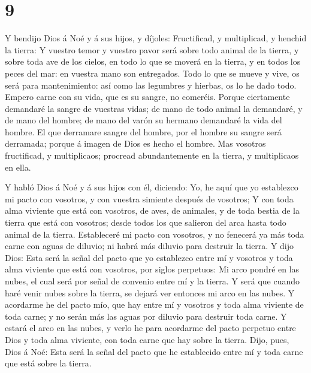 \hypertarget{section-8}{%
\section{9}\label{section-8}}

 Y bendijo Dios á Noé y á sus hijos, y díjoles: Fructificad,
y multiplicad, y henchid la tierra:  Y vuestro temor y
vuestro pavor será sobre todo animal de la tierra, y sobre toda ave de
los cielos, en todo lo que se moverá en la tierra, y en todos los peces
del mar: en vuestra mano son entregados.  Todo lo que se
mueve y vive, os será para mantenimiento: así como las legumbres y
hierbas, os lo he dado todo.  Empero carne con su vida, que
es su sangre, no comeréis.  Porque ciertamente demandaré la
sangre de vuestras vidas; de mano de todo animal la demandaré, y de mano
del hombre; de mano del varón su hermano demandaré la vida del hombre.
 El que derramare sangre del hombre, por el hombre su sangre
será derramada; porque á imagen de Dios es hecho el hombre. 
Mas vosotros fructificad, y multiplicaos; procread abundantemente en la
tierra, y multiplicaos en ella.

 Y habló Dios á Noé y á sus hijos con él, diciendo:
 Yo, he aquí que yo establezco mi pacto con vosotros, y con
vuestra simiente después de vosotros;  Y con toda alma
viviente que está con vosotros, de aves, de animales, y de toda bestia
de la tierra que está con vosotros; desde todos los que salieron del
arca hasta todo animal de la tierra.  Estableceré mi pacto
con vosotros, y no fenecerá ya más toda carne con aguas de diluvio; ni
habrá más diluvio para destruir la tierra.  Y dijo Dios:
Esta será la señal del pacto que yo establezco entre mí y vosotros y
toda alma viviente que está con vosotros, por siglos perpetuos:
 Mi arco pondré en las nubes, el cual será por señal de
convenio entre mí y la tierra.  Y será que cuando haré
venir nubes sobre la tierra, se dejará ver entonces mi arco en las
nubes.  Y acordarme he del pacto mío, que hay entre mí y
vosotros y toda alma viviente de toda carne; y no serán más las aguas
por diluvio para destruir toda carne.  Y estará el arco en
las nubes, y verlo he para acordarme del pacto perpetuo entre Dios y
toda alma viviente, con toda carne que hay sobre la tierra.
 Dijo, pues, Dios á Noé: Esta será la señal del pacto que
he establecido entre mí y toda carne que está sobre la tierra.

